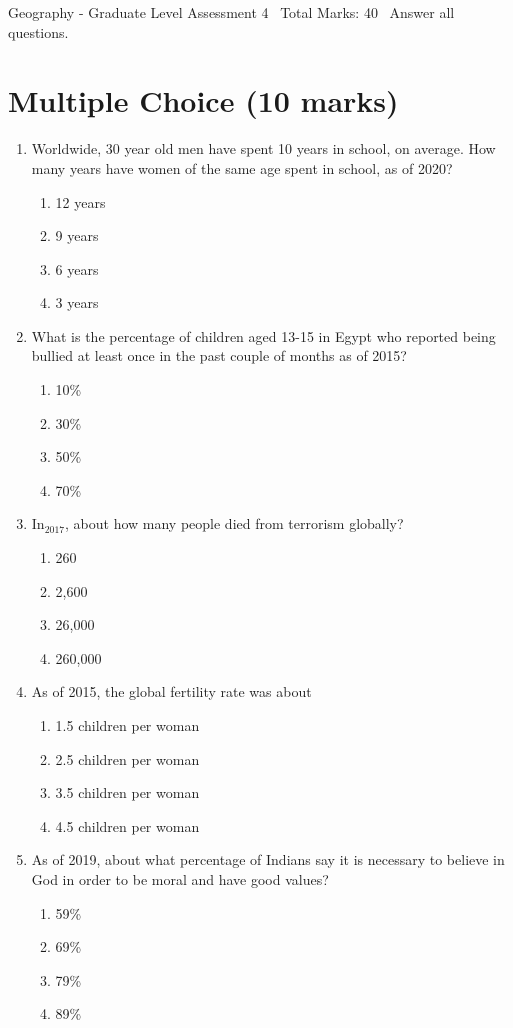 \documentclass[12pt]{article}
\begin{document}
\begin{center}
Geography - Graduate Level Assessment 4 \
Total Marks: 40 \
Answer all questions.
\end{center}

\section*{Multiple Choice (10 marks)}
\begin{enumerate}[label=\arabic*.]
\item Worldwide, 30 year old men have spent 10 years in school, on average. How many years have women of the same age spent in school, as of 2020?
\begin{enumerate}[label=(\alph*)]
    \item 12 years
    \item 9 years
    \item 6 years
    \item 3 years
\end{enumerate}
\item What is the percentage of children aged 13-15 in Egypt who reported being bullied at least once in the past couple of months as of 2015?
\begin{enumerate}[label=(\alph*)]
    \item 10\%
    \item 30\%
    \item 50\%
    \item 70\%
\end{enumerate}
\item In$_{2017}$, about how many people died from terrorism globally?
\begin{enumerate}[label=(\alph*)]
    \item 260
    \item 2,600
    \item 26,000
    \item 260,000
\end{enumerate}
\item As of 2015, the global fertility rate was about
\begin{enumerate}[label=(\alph*)]
    \item 1.5 children per woman
    \item 2.5 children per woman
    \item 3.5 children per woman
    \item 4.5 children per woman
\end{enumerate}
\item As of 2019, about what percentage of Indians say it is necessary to believe in God in order to be moral and have good values?
\begin{enumerate}[label=(\alph*)]
    \item 59\%
    \item 69\%
    \item 79\%
    \item 89\%
\end{enumerate}
\end{enumerate}
\end{document}
